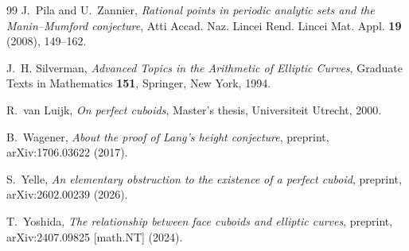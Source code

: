 \documentclass[11pt,reqno]{amsart}
\theoremstyle{plain}
\theoremstyle{definition}
\theoremstyle{remark}
\begin{document}
\begin{thebibliography}{99}
J.~Pila and U.~Zannier,
\emph{Rational points in periodic analytic sets and the Manin--Mumford conjecture},
Atti Accad. Naz. Lincei Rend. Lincei Mat. Appl. \textbf{19} (2008), 149--162.

J.~H. Silverman,
\emph{Advanced Topics in the Arithmetic of Elliptic Curves},
Graduate Texts in Mathematics \textbf{151}, Springer, New York, 1994.

R.~van Luijk,
\emph{On perfect cuboids},
Master's thesis, Universiteit Utrecht, 2000.

B.~Wagener,
\emph{About the proof of Lang's height conjecture},
preprint, arXiv:1706.03622 (2017).

S.~Yelle,
\emph{An elementary obstruction to the existence of a perfect cuboid},
preprint, arXiv:2602.00239 (2026).

T.~Yoshida,
\emph{The relationship between face cuboids and elliptic curves},
preprint, arXiv:2407.09825 [math.NT] (2024).

\end{thebibliography}
\end{document}
